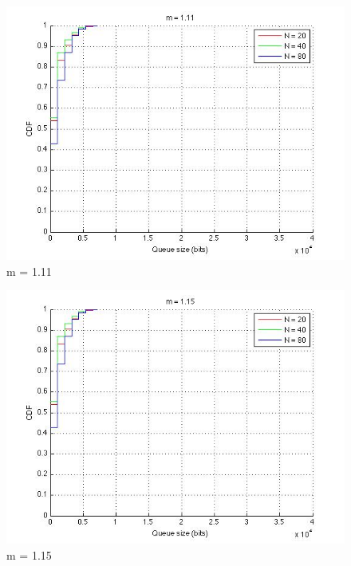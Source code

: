   \begin{figure}[h]
    \includegraphics[scale=0.55]{img/m111.jpg}
    \caption{m = 1.11}
  \end{figure}

  \begin{figure}[h]
    \includegraphics[scale=0.55]{img/m115.jpg}
    \caption{m = 1.15}
  \end{figure}
